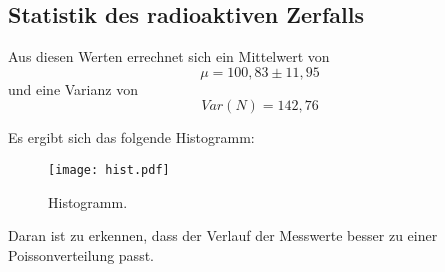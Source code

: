 \subsection{Statistik des radioaktiven Zerfalls}
Aus diesen Werten errechnet sich ein Mittelwert von
\begin{equation*}
  \mu = 100,83 \pm 11,95
\end{equation*}
und eine Varianz von
\begin{equation*}
  Var(N) = 142,76
\end{equation*}

Es ergibt sich das folgende Histogramm:
\begin{figure}[H]
  \centering
  \texttt{[image: hist.pdf]}
  \caption{Histogramm.}
  \label{fig:hist}
\end{figure}

Daran ist zu erkennen, dass der Verlauf der Messwerte besser zu einer Poissonverteilung passt.
